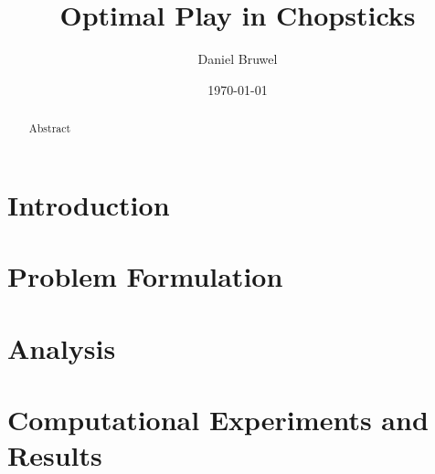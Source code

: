 \documentclass[11pt]{article}
\title{Optimal Play in Chopsticks}
\author{Daniel Bruwel}
\date{\today}
\begin{document}
\maketitle

\begin{abstract}
Abstract
\end{abstract}

\section{Introduction}
\cite{chvatal1979greedy}

\section{Problem Formulation}

\section{Analysis}

\section{Computational Experiments and Results}




\end{document}
